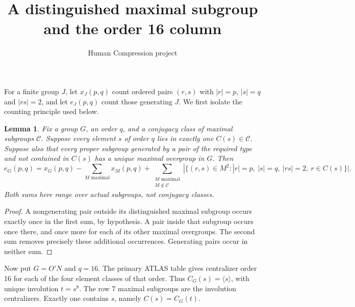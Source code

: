 \documentclass[11pt,a4paper]{article}
\title{A distinguished maximal subgroup and the order 16 column}
\author{Human Compression project}\date{}
\newtheorem{lemma}{Lemma}\newtheorem{theorem}{Theorem}
\begin{document}
\maketitle
For a finite group $J$, let $x_J(p,q)$ count ordered pairs $(r,s)$
with $|r|=p$, $|s|=q$ and $|rs|=2$, and let $e_J(p,q)$ count those
generating $J$. We first isolate the counting principle used below.

\begin{lemma}\label{distinguished}
Fix a group $G$, an order $q$, and a conjugacy class of maximal
subgroups $\mathcal C$. Suppose every element $s$ of order $q$
lies in exactly one $C(s)\in\mathcal C$. Suppose also that every
proper subgroup generated by a pair of the required type and
not contained in $C(s)$ has a unique maximal overgroup in $G$.
Then
\[
e_G(p,q)=x_G(p,q)-\sum_{M\text{ maximal}}x_M(p,q)
 +\sum_{\substack{M\text{ maximal}\\M\notin\mathcal C}}
 |\{(r,s)\in M^2: |r|=p,\ |s|=q,\ |rs|=2,\ r\in C(s)\}|.
\]
Both sums here range over actual subgroups, not conjugacy classes.
\end{lemma}
\begin{proof}
A nongenerating pair outside its distinguished maximal subgroup
occurs exactly once in the first sum, by hypothesis. A pair inside
that subgroup occurs once there, and once more for each of its
other maximal overgroups. The second sum removes precisely these
additional occurrences. Generating pairs occur in neither sum.
\end{proof}

Now put $G=O'N$ and $q=16$. The primary ATLAS table gives centralizer
order 16 for each of the four element classes of that order. Thus
$C_G(s)=\langle s\rangle$, with unique involution $t=s^8$.
The row 7 maximal subgroups are the involution centralizers.
Exactly one contains $s$, namely $C(s)=C_G(t)$.
\end{document}
